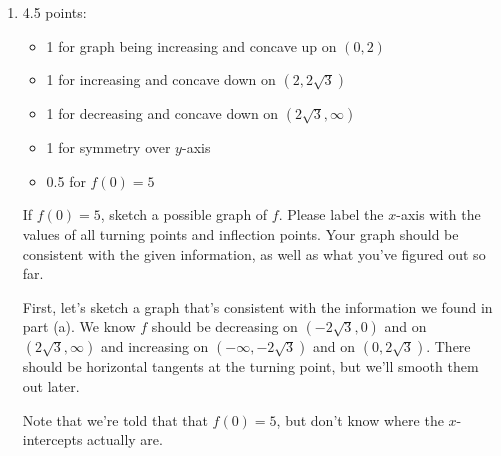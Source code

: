 \documentclass{article}
\begin{document}
\begin{enumerate}
\begin{enumerate}
  \item \label{sketch-from-cubic-derivative-1-possibility-1}

    \begin{grading}
      4.5 points:
      \begin{itemize}[nosep]
      \item 1 for graph being increasing and concave up on $(0, 2)$
      \item 1 for increasing and concave down on $(2, 2 \sqrt{3})$
      \item 1 for decreasing and concave down on $(2 \sqrt{3}, \infty)$
      \item 1 for symmetry over $y$-axis
      \item 0.5 for $f(0) = 5$
      \end{itemize}
    \end{grading}

    \begin{problem}[\stretch{2}]
      If $f(0) = 5$, sketch a possible graph of $f$. Please label the $x$-axis with the values of all turning points and inflection points. Your graph should be consistent with the given information, as well as what you've figured out so far. 
    \end{problem}

    \begin{solution}
      First, let's sketch a graph that's consistent with the information we found in part (a). We know
      $f$ should be decreasing on $(-2\sqrt{3}, 0)$ and on $(2\sqrt{3}, \infty)$
      and increasing on $(-\infty, -2\sqrt{3})$ and on $(0, 2\sqrt{3})$. 
      There should be horizontal tangents at the turning point, but we'll smooth them out later.

      \begin{center}
      \end{center}

     Note that we're told that that $f(0)=5$, but don't know where the $x$-intercepts actually are.


\end{solution}
\end{enumerate}
\end{enumerate}
\end{document}
